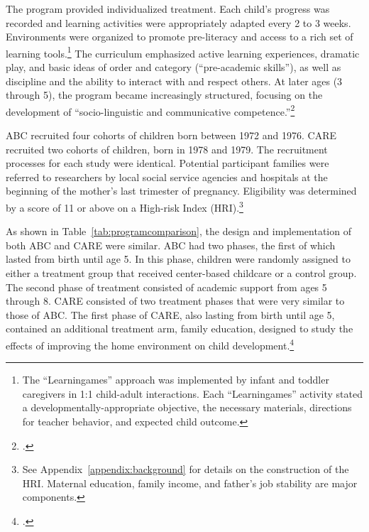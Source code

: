 The program provided individualized treatment. Each child's progress was recorded and learning activities were appropriately adapted every 2 to 3 weeks. Environments were organized to promote pre-literacy and access to a rich set of learning tools.\footnote{The ``Learningames'' approach was implemented by infant and toddler caregivers in 1:1 child-adult interactions. Each ``Learningames'' activity stated a developmentally-appropriate objective, the necessary materials, directions for teacher behavior, and expected child outcome.} The curriculum emphasized active learning experiences, dramatic play, and basic ideas of order and category (``pre-academic skills''), as well as discipline and the ability to interact with and respect others.  At later ages (3 through 5), the program became increasingly structured, focusing on the development of ``socio-linguistic and communicative competence.''\footnote{\citet{Ramey-et-al_1977_Intro-to-ABC, Haskins_1985_CD, Ramey_1981_Modification, Ramey_Campbell_1979_SR, Ramey_Smith_1977_AJMD, Ramey_McGinness_etal_1982_Abecedarianapproach, Sparling_Lewis_1979_BOOKLearninggamesFirstThree,Sparling_Lewis_1984_BOOKLearningGamesThreesFours}.}

ABC recruited four cohorts of children born between 1972 and 1976. CARE recruited two cohorts of children, born in 1978 and 1979. The recruitment processes for each study were identical. Potential participant families were referred to researchers by local social service agencies and hospitals at the beginning of the mother's last trimester of pregnancy. Eligibility was determined by a score of 11 or above on a High-risk Index (HRI).\footnote{See Appendix~\ref{appendix:background} for details on the construction of the HRI. Maternal education, family income, and father's job stability are major components.}

As shown in Table~\ref{tab:programcomparison}, the design and implementation of both ABC and CARE were similar. ABC had two phases, the first of which lasted from birth until age 5. In this phase, children were randomly assigned to either a treatment group that received center-based childcare or a control group. The second phase of treatment consisted of academic support from ages 5 through 8. CARE consisted of two treatment phases that were very similar to those of ABC. The first phase of CARE, also lasting from birth until age 5, contained an additional treatment arm, family education, designed to study the effects of improving the home environment on child development.\footnote{\citet{Wasik_Ramey_etal_1990_CD}.}

